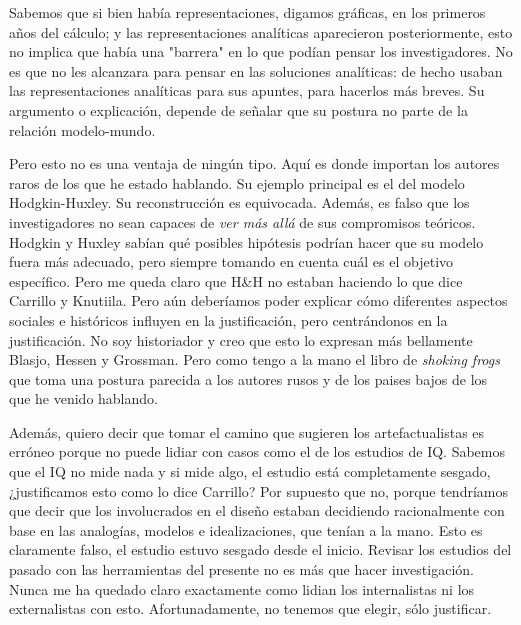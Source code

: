 Sabemos que si bien había representaciones, digamos gráficas, en los primeros años del cálculo; y las representaciones analíticas aparecieron posteriormente, esto no implica que había una "barrera" en lo que podían pensar los investigadores.
No es que no les alcanzara para pensar en las soluciones analíticas: de hecho usaban las representaciones analíticas para sus apuntes, para hacerlos más breves.
Su argumento o explicación, depende de señalar que su postura no parte de la relación modelo-mundo.

Pero esto no es una ventaja de ningún tipo.
Aquí es donde importan los autores raros de los que he estado hablando.
Su ejemplo principal es el del modelo Hodgkin-Huxley.
Su reconstrucción es equivocada.
Además, es falso que los investigadores no sean capaces de \emph{ver más allá} de sus compromisos teóricos.
Hodgkin y Huxley sabían qué posibles hipótesis podrían hacer que su modelo fuera más adecuado, pero siempre tomando en cuenta cuál es el objetivo específico.
Pero me queda claro que H\&H no estaban haciendo lo que dice Carrillo y Knutiila.
Pero aún deberíamos poder explicar cómo diferentes aspectos sociales e históricos influyen en la justificación, pero centrándonos en la justificación.
No soy historiador y creo que esto lo expresan más bellamente Blasjo, Hessen y Grossman.
Pero como tengo a la mano el libro de \emph{shoking frogs} que toma una postura parecida a los autores rusos y de los paises bajos de los que he venido hablando.

Además, quiero decir que tomar el camino que sugieren los artefactualistas es erróneo porque no puede lidiar con casos como el de los estudios de IQ.
Sabemos que el IQ no mide nada y si mide algo, el estudio está completamente sesgado, ¿justificamos esto como lo dice Carrillo?
Por supuesto que no, porque tendríamos que decir que los involucrados en el diseño estaban decidiendo racionalmente con base en las analogías, modelos e idealizaciones, que tenían a la mano.
Esto es claramente falso, el estudio estuvo sesgado desde el inicio.
Revisar los estudios del pasado con las herramientas del presente no es más que hacer investigación.
Nunca me ha quedado claro exactamente como lidian los internalistas ni los externalistas con esto.
Afortunadamente, no tenemos que elegir, sólo justificar.

